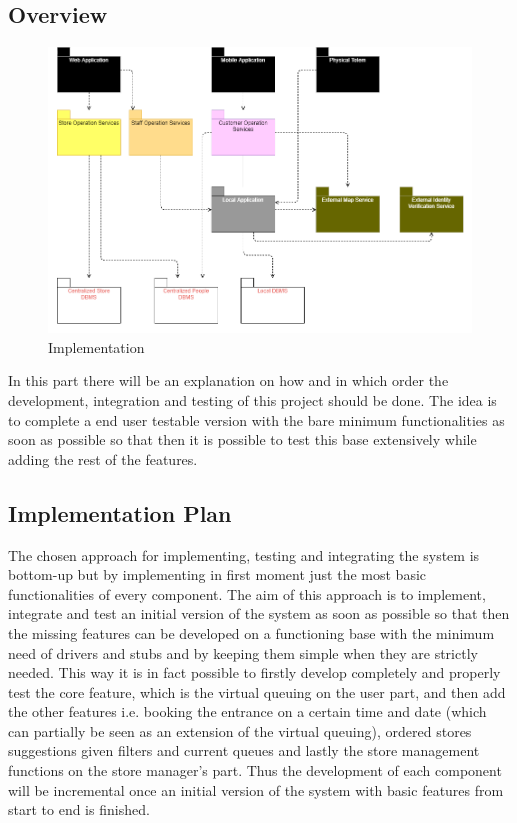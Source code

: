 \subsection{Overview}
\begin{figure}[h!]
	\includegraphics[width=\linewidth]{../Diagrams/IntegrationImplementation/IntegrationOverview.png}
	\caption{Implementation}
	\label{fig:Implementation1}
\end{figure}
In this part there will be an explanation on how and in which order the development, integration and testing of this project should be done. The idea is to complete a end user testable version with the bare minimum functionalities as soon as possible so that then it is possible to test this base extensively while adding the rest of the features.
\subsection{Implementation Plan}
The chosen approach for implementing, testing and integrating the system is bottom-up but by implementing in first moment just the most basic functionalities of every component.
The aim of this approach is to implement, integrate and test an initial version of the system as soon as possible so that then the missing features can be developed on a functioning base with the minimum need of drivers and stubs and by keeping them simple when they are strictly needed.
This way it is in fact possible to firstly develop completely and properly test the core feature, which is the virtual queuing on the user part, and then add the other features i.e. booking the entrance on a certain time and date (which can partially be seen as an extension of the virtual queuing), ordered stores suggestions given filters and current queues and lastly the store management functions on the store manager’s part.
Thus the development of each component will be incremental once an initial version of the system with basic features from start to end is finished.
\\

